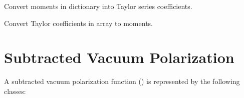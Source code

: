 \documentclass[letterpaper,10pt,english]{sphinxmanual}
\begin{document}
\begin{fulllineitems}
\label{g2tools:g2tools.mom2taylor}
Convert moments in dictionary  into Taylor series coefficients.

\end{fulllineitems}


\begin{fulllineitems}
\label{g2tools:g2tools.taylor2mom}
Convert Taylor coefficients in array  to moments.

\end{fulllineitems}



\section{Subtracted Vacuum Polarization}
\label{g2tools:subtracted-vacuum-polarization}
A subtracted vacuum polarization function () is
represented by the following classes:
\end{document}
